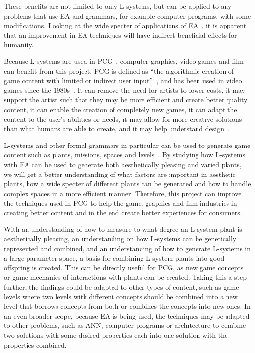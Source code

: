 These benefits are not limited to only \glspl{L-system}, but can be applied to any problems that use \gls{EA} and grammars, for example computer programs, with some modifications.
Looking at the wide specter of applications of \gls{EA}~\cite{2006AshlockEA}, it is apparent that an improvement in \gls{EA} techniques will have indirect beneficial effects for humanity.

Because \glspl{L-system} are used in \gls{PCG}~\cite{PCG_5}, computer graphics, video games and film can benefit from this project.
\Gls{PCG} is defined as ``the algorithmic creation of game content with limited or indirect user input''~\cite{2011Togelius}, and has been used in video games since the 1980s~\cite{PCG_1}.
It can remove the need for artists to lower costs, it may support the artist such that they may be more efficient and create better quality content, it can enable the creation of completely new games, it can adapt the content to the user's abilities or needs, it may allow for more creative solutions than what humans are able to create, and it may help understand design~\cite{PCG_1}.

\Glspl{L-system} and other formal grammars in particular can be used to generate game content such as plants, missions, spaces and levels~\cite{PCG_5}.
By studying how \glspl{L-system} with \gls{EA} can be used to generate both aesthetically pleasing and varied plants, we will get a better understanding of what factors are important in aesthetic plants, how a wide specter of different plants can be generated and how to handle complex spaces in a more efficient manner.
Therefore, this project can improve the techniques used in \gls{PCG} to help the game, graphics and film industries in creating better content and in the end create better experiences for consumers.

With an understanding of how to measure to what degree an L-system plant is aesthetically pleasing, an understanding on how L-systems can be genetically represented and combined, and an understanding of how to generate L-systems in a large parameter space, a basis for combining L-system plants into good offspring is created.
This can be directly useful for \gls{PCG}, as new game concepts or game mechanics of interactions with plants can be created.
Taking this a step further, the findings could be adapted to other types of content, such as game levels where two levels with different concepts should be combined into a new level that borrows concepts from both or combines the concepts into new ones.
In an even broader scope, because \gls{EA} is being used, the techniques may be adapted to other problems, such as \gls{ANN}, computer programs or architecture to combine two solutions with some desired properties each into one solution with the properties combined.

